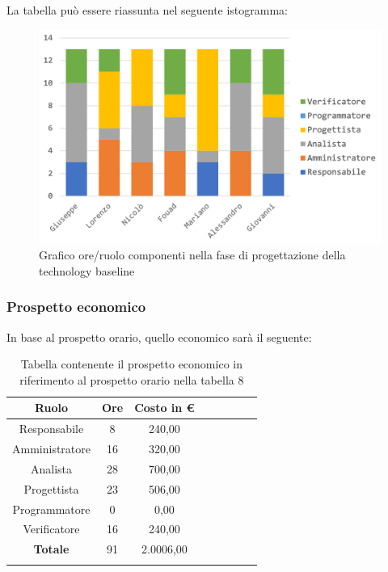 		La tabella può essere riassunta nel seguente istogramma:
		\begin{figure}[H]
			\centering
			\includegraphics[width=0.8\linewidth]{./images/preventivo/progArch1.png}
			\caption{Grafico ore/ruolo componenti nella fase di progettazione della technology baseline}
			\label{fig:grafico suddivione ruoli fase progettazione della technology baseline}
		\end{figure}
	
		\subsubsection{Prospetto economico}
		In base al prospetto orario, quello economico sarà il seguente: 
		
		\begin{longtable}{|c|c|c|c|c|c|c|c|}
			\hline
			\rowcolor{lighter-grayer}
			\textbf{Ruolo} & \textbf{Ore} & \textbf{Costo in € } \\
			\hline
			\endfirsthead
			
			\hline
			Responsabile 	    & 8 & 240,00\\
			\hline 
			\hline
			Amministratore	  & 16 & 320,00\\
			\hline
			\hline
			Analista 				& 28 & 700,00\\
			\hline
			\hline
			Progettista 		  & 23 & 506,00\\
			\hline
			\hline
			Programmatore 	 & 0 & 0,00\\
			\hline
			\hline
			Verificatore 		  & 16 & 240,00\\
			\hline
			\textbf{Totale} 	& 91 & 2.0006,00\\
			\hline
			\caption{Tabella contenente il prospetto economico in riferimento al prospetto orario nella tabella 8}
		\end{longtable}
		\pagebreak
		
